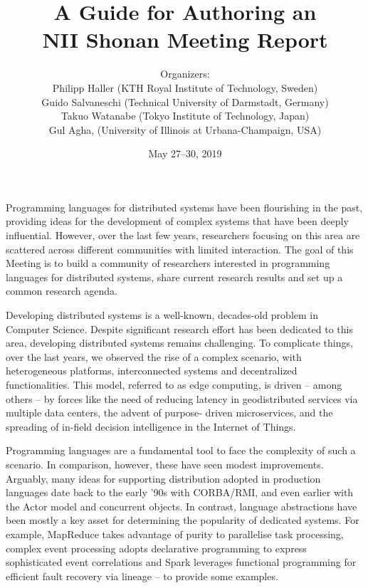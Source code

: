 \documentclass[a4paper]{article}
\begin{document}
\SHONANmakecover

\title{A Guide for Authoring an\\ NII Shonan Meeting Report}
\author{Organizers:\\
Philipp Haller (KTH Royal Institute of Technology, Sweden)\\
Guido Salvaneschi (Technical University of Darmstadt, Germany)\\
Takuo Watanabe (Tokyo Institute of Technology, Japan)\\
Gul Agha, (University of Illinois at Urbana-Champaign, USA)}
\date{May 27--30, 2019}
\maketitle

Programming languages for distributed systems have been flourishing in the past, providing ideas for the development of complex systems that have been deeply influential. However, over the last few years, researchers focusing on this area are scattered across different communities with limited interaction. The goal of this Meeting is to build a community of researchers interested in programming languages for distributed systems, share current research results and set up a common research agenda.

Developing distributed systems is a well-known, decades-old problem in Computer Science. Despite significant research effort has been dedicated to this area, developing distributed systems remains challenging. To complicate things, over the last years, we observed the rise of a complex scenario, with heterogeneous platforms, interconnected systems and decentralized functionalities. This model, referred to as edge computing, is driven – among others – by forces like the need of reducing latency in geodistributed services via multiple data centers, the advent of purpose- driven microservices, and the spreading of in-field decision intelligence in the Internet of Things.

Programming languages are a fundamental tool to face the complexity of such a scenario. In comparison, however, these have seen modest improvements. Arguably, many ideas for supporting distribution adopted in production languages date back to the early '90s with CORBA/RMI, and even earlier with the Actor model and concurrent objects. In contrast, language abstractions have been mostly a key asset for determining the popularity of dedicated systems. For example, MapReduce takes advantage of purity to parallelise task processing, complex event processing adopts declarative programming to express sophisticated event correlations and Spark leverages functional programming for efficient fault recovery via lineage -- to provide some examples.
\end{document}
